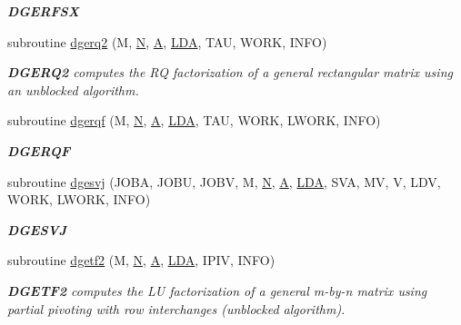 \begin{DoxyCompactItemize}
\begin{DoxyCompactList}\small\item\em {\bfseries D\+G\+E\+R\+F\+S\+X} \end{DoxyCompactList}\item 
subroutine \hyperlink{group__doubleGEcomputational_ga360f5b8b756dc7d366c3decfcdf89000}{dgerq2} (M, \hyperlink{polmisc_8c_a0240ac851181b84ac374872dc5434ee4}{N}, \hyperlink{classA}{A}, \hyperlink{example__user_8c_ae946da542ce0db94dced19b2ecefd1aa}{L\+D\+A}, T\+A\+U, W\+O\+R\+K, I\+N\+F\+O)
\begin{DoxyCompactList}\small\item\em {\bfseries D\+G\+E\+R\+Q2} computes the R\+Q factorization of a general rectangular matrix using an unblocked algorithm. \end{DoxyCompactList}\item 
subroutine \hyperlink{group__doubleGEcomputational_ga7bba0d791b011eb5425ecbf500e9be2c}{dgerqf} (M, \hyperlink{polmisc_8c_a0240ac851181b84ac374872dc5434ee4}{N}, \hyperlink{classA}{A}, \hyperlink{example__user_8c_ae946da542ce0db94dced19b2ecefd1aa}{L\+D\+A}, T\+A\+U, W\+O\+R\+K, L\+W\+O\+R\+K, I\+N\+F\+O)
\begin{DoxyCompactList}\small\item\em {\bfseries D\+G\+E\+R\+Q\+F} \end{DoxyCompactList}\item 
subroutine \hyperlink{group__doubleGEcomputational_gac14340a964d1df1b2f4483844a7c0df1}{dgesvj} (J\+O\+B\+A, J\+O\+B\+U, J\+O\+B\+V, M, \hyperlink{polmisc_8c_a0240ac851181b84ac374872dc5434ee4}{N}, \hyperlink{classA}{A}, \hyperlink{example__user_8c_ae946da542ce0db94dced19b2ecefd1aa}{L\+D\+A}, S\+V\+A, M\+V, V, L\+D\+V, W\+O\+R\+K, L\+W\+O\+R\+K, I\+N\+F\+O)
\begin{DoxyCompactList}\small\item\em {\bfseries D\+G\+E\+S\+V\+J} \end{DoxyCompactList}\item 
subroutine \hyperlink{group__doubleGEcomputational_ga8360b5b2c819e19c82bfd7e6b8285f74}{dgetf2} (M, \hyperlink{polmisc_8c_a0240ac851181b84ac374872dc5434ee4}{N}, \hyperlink{classA}{A}, \hyperlink{example__user_8c_ae946da542ce0db94dced19b2ecefd1aa}{L\+D\+A}, I\+P\+I\+V, I\+N\+F\+O)
\begin{DoxyCompactList}\small\item\em {\bfseries D\+G\+E\+T\+F2} computes the L\+U factorization of a general m-\/by-\/n matrix using partial pivoting with row interchanges (unblocked algorithm). \end{DoxyCompactList}\item 

\end{DoxyCompactItemize}
